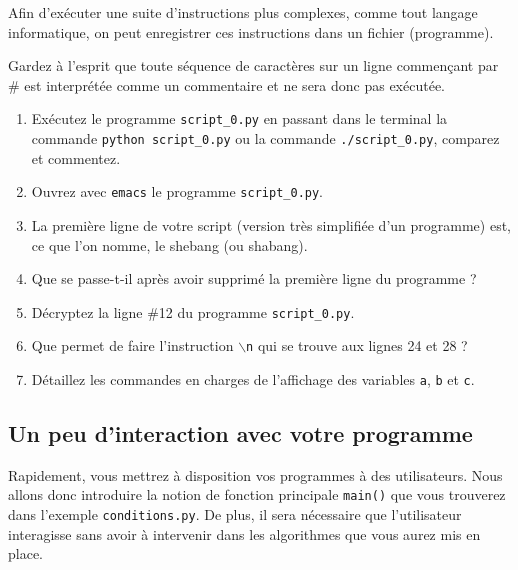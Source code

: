 Afin d'exécuter  une suite  d'instructions plus complexes,  comme tout
langage  informatique, on  peut enregistrer  ces instructions  dans un
fichier (programme).

Gardez à l'esprit  que toute séquence de caractères sur un ligne 
commençant par \#  est interprétée comme un commentaire 
et ne sera donc pas exécutée.

\begin{enumerate}
\item Exécutez  le programme \texttt{script\_0.py} en  passant dans le
  terminal  la commande  \texttt{python script\_0.py}  ou la  commande
  \texttt{./script\_0.py}, comparez et commentez.

\item Ouvrez avec \texttt{emacs} le programme \texttt{script\_0.py}.

\item La première ligne de  votre script (version très simplifiée d'un
  programme) est, ce que l'on nomme, le shebang (ou shabang).

\item Que  se passe-t-il après  avoir supprimé  la première  ligne du
  programme ?

\item Décryptez la ligne \#12 du programme \texttt{script\_0.py}.

\item Que permet de  faire l'instruction \texttt{$\backslash$n} qui se
  trouve aux lignes 24 et 28 ?

\item Détaillez les commandes en  charges de l'affichage des variables
  \texttt{a}, \texttt{b} et \texttt{c}.


\end{enumerate}




\subsection{Un peu d'interaction avec votre programme}


Rapidement,  vous   mettrez  à   disposition  vos  programmes   à  des
utilisateurs.   Nous  allons donc  introduire  la  notion de  fonction
principale   \texttt{main()}  que   vous   trouverez  dans   l'exemple
\texttt{conditions.py}.  De plus, il sera nécessaire que l'utilisateur
interagisse  sans avoir  à intervenir  dans les  algorithmes que  vous
aurez mis en place.


